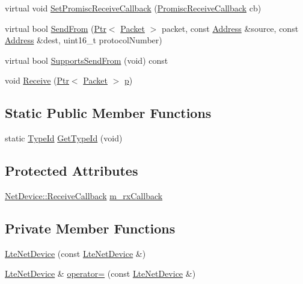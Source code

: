 \begin{DoxyCompactItemize}
virtual void \hyperlink{classns3_1_1LteNetDevice_aebcccb4e0b3cf13758c1d71a68b50c5e}{Set\+Promisc\+Receive\+Callback} (\hyperlink{classns3_1_1NetDevice_a427225795919f26c414bee2ea3f31ed2}{Promisc\+Receive\+Callback} cb)
\item 
virtual bool \hyperlink{classns3_1_1LteNetDevice_a5db1286052905f80b9df65b6af5f3c5e}{Send\+From} (\hyperlink{classns3_1_1Ptr}{Ptr}$<$ \hyperlink{classns3_1_1Packet}{Packet} $>$ packet, const \hyperlink{classns3_1_1Address}{Address} \&source, const \hyperlink{classns3_1_1Address}{Address} \&dest, uint16\+\_\+t protocol\+Number)
\item 
virtual bool \hyperlink{classns3_1_1LteNetDevice_a8d32acea05264438f8acfaee0b035d5b}{Supports\+Send\+From} (void) const 
\item 
void \hyperlink{classns3_1_1LteNetDevice_a52302e688e6fdf9abba088b2b26e5408}{Receive} (\hyperlink{classns3_1_1Ptr}{Ptr}$<$ \hyperlink{classns3_1_1Packet}{Packet} $>$ \hyperlink{lte__link__budget__x2__handover__measures_8m_ac9de518908a968428863f829398a4e62}{p})
\end{DoxyCompactItemize}
\subsection*{Static Public Member Functions}
\begin{DoxyCompactItemize}
\item 
static \hyperlink{classns3_1_1TypeId}{Type\+Id} \hyperlink{classns3_1_1LteNetDevice_aaec0cc5555cbb6c66cbdb26a216866a6}{Get\+Type\+Id} (void)
\end{DoxyCompactItemize}
\subsection*{Protected Attributes}
\begin{DoxyCompactItemize}
\item 
\hyperlink{classns3_1_1NetDevice_ad5e5e1ca187472bc2ba99575d8def568}{Net\+Device\+::\+Receive\+Callback} \hyperlink{classns3_1_1LteNetDevice_a6ce4fb791c9763abdfe4bd5c594e93a3}{m\+\_\+rx\+Callback}
\end{DoxyCompactItemize}
\subsection*{Private Member Functions}
\begin{DoxyCompactItemize}
\item 
\hyperlink{classns3_1_1LteNetDevice_a82ee38488a2cf29dc6cd6b3017a9de7d}{Lte\+Net\+Device} (const \hyperlink{classns3_1_1LteNetDevice}{Lte\+Net\+Device} \&)
\item 
\hyperlink{classns3_1_1LteNetDevice}{Lte\+Net\+Device} \& \hyperlink{classns3_1_1LteNetDevice_ab5d2ee5b0b36f4deaf0e84f96adf065e}{operator=} (const \hyperlink{classns3_1_1LteNetDevice}{Lte\+Net\+Device} \&)
\end{DoxyCompactItemize}
